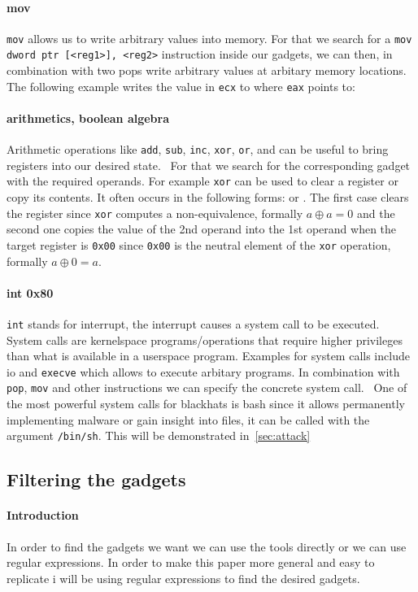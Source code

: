 \documentclass[journal=tosc,submission, notanonymous]{iacrtrans}
\begin{document}
\paragraph{mov}
\Verb+mov+ allows us to write arbitrary values into memory. For that we search for a \Verb+mov dword ptr [<reg1>], <reg2>+ instruction inside our gadgets, we can then, in combination with two pops write arbitrary values at arbitary memory locations.~\cite{ropsla} The following example writes the value in \Verb+ecx+ to where \Verb+eax+ points to: 
\paragraph{arithmetics, boolean algebra}
Arithmetic operations like \Verb+add+, \Verb+sub+, \Verb+inc+, \Verb+xor+, \Verb+or+, and can be useful to bring registers into our desired state.~\cite{ropsla} For that we search for the corresponding gadget with the required operands. For example \Verb+xor+ can be used to clear a register or copy its contents. It often occurs in the following forms:  or . The first case clears the register since \Verb+xor+ computes a non-equivalence, formally $a \oplus a = 0$ and the second one copies the value of the 2nd operand into the 1st operand when the target register is \Verb+0x00+ since \Verb+0x00+ is the neutral element of the \Verb+xor+ operation, formally $a \oplus 0 = a$.
\paragraph{int 0x80}
\Verb+int+ stands for interrupt, the interrupt  causes a system call to be executed. System calls are kernelspace programs/operations that require higher privileges than what is available in a userspace program. Examples for system calls include io and \Verb+execve+ which allows to execute arbitary programs. In combination with \Verb+pop+, \Verb+mov+ and other instructions we can specify the concrete system call.~\cite{ropsla} One of the most powerful system calls for blackhats is bash since it allows permanently implementing malware or gain insight into files, it can be called with the argument \Verb+/bin/sh+. This will be demonstrated in~\cref{sec:attack}
\subsection{Filtering the gadgets}
\paragraph{Introduction}
In order to find the gadgets we want we can use the tools directly or we can use regular expressions. In order to make this paper more general and easy to replicate i will be using regular expressions to find the desired gadgets.
\end{document}
